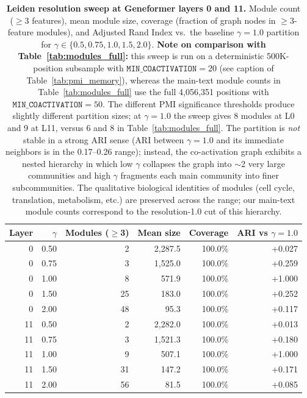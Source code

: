 \documentclass[11pt]{article}
\begin{document}
\begin{table}[H]
\centering
\caption{\textbf{Leiden resolution sweep at Geneformer layers 0 and 11.} Module count ($\geq$3 features), mean module size, coverage (fraction of graph nodes in $\geq$3-feature modules), and Adjusted Rand Index vs.\ the baseline $\gamma{=}1.0$ partition for $\gamma \in \{0.5, 0.75, 1.0, 1.5, 2.0\}$. \textbf{Note on comparison with Table~\ref{tab:modules_full}:} this sweep is run on a deterministic 500K-position subsample with $\texttt{MIN\_COACTIVATION}{=}20$ (see caption of Table~\ref{tab:pmi_memory}), whereas the main-text module counts in Table~\ref{tab:modules_full} use the full 4{,}056{,}351 positions with $\texttt{MIN\_COACTIVATION}{=}50$. The different PMI significance thresholds produce slightly different partition sizes; at $\gamma{=}1.0$ the sweep gives 8 modules at L0 and 9 at L11, versus 6 and 8 in Table~\ref{tab:modules_full}.  The partition is \emph{not} stable in a strong ARI sense (ARI between $\gamma{=}1.0$ and its immediate neighbors is in the 0.17--0.26 range); instead, the co-activation graph exhibits a nested hierarchy in which low $\gamma$ collapses the graph into $\sim$2 very large communities and high $\gamma$ fragments each main community into finer subcommunities. The qualitative biological identities of modules (cell cycle, translation, metabolism, etc.) are preserved across the range; our main-text module counts correspond to the resolution-1.0 cut of this hierarchy.}
\label{tab:leiden_sweep}
\smallskip
\small
\begin{tabular}{rrrrrr}
\toprule
Layer & $\gamma$ & Modules ($\geq$3) & Mean size & Coverage & ARI vs $\gamma{=}1.0$ \\
\midrule
0  & 0.50 &  2 & 2{,}287.5 & 100.0\% & +0.027 \\
0  & 0.75 &  3 & 1{,}525.0 & 100.0\% & +0.259 \\
0  & 1.00 &  8 &    571.9 & 100.0\% & +1.000 \\
0  & 1.50 & 25 &    183.0 & 100.0\% & +0.252 \\
0  & 2.00 & 48 &     95.3 & 100.0\% & +0.117 \\
\midrule
11 & 0.50 &  2 & 2{,}282.0 & 100.0\% & +0.013 \\
11 & 0.75 &  3 & 1{,}521.3 & 100.0\% & +0.180 \\
11 & 1.00 &  9 &    507.1 & 100.0\% & +1.000 \\
11 & 1.50 & 31 &    147.2 & 100.0\% & +0.171 \\
11 & 2.00 & 56 &     81.5 & 100.0\% & +0.085 \\
\bottomrule
\end{tabular}
\end{table}
\end{document}
